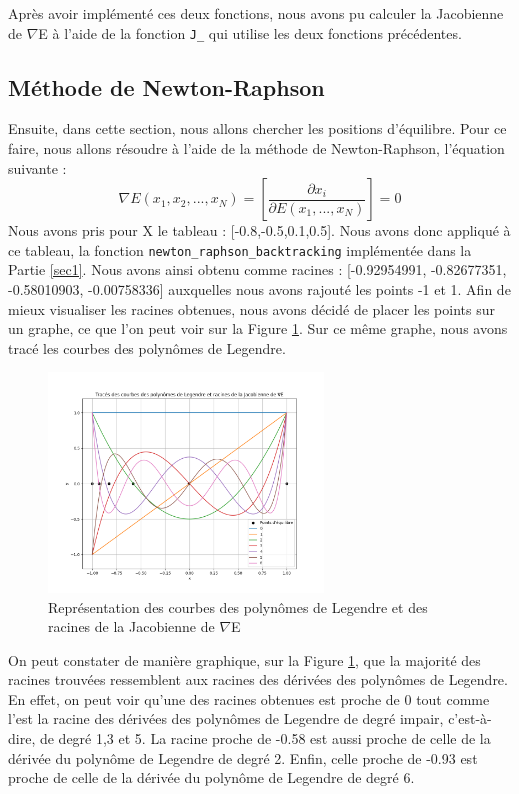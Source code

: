 Après avoir implémenté ces deux fonctions, nous avons pu calculer la Jacobienne de $\nabla$E à l'aide de la fonction \verb|J_| qui utilise les deux fonctions précédentes. 
\subsection{Méthode de Newton-Raphson}
Ensuite, dans cette section, nous allons chercher les positions d'équilibre. Pour ce faire, nous allons résoudre à l'aide de la méthode de Newton-Raphson, l'équation suivante :
\begin{equation*}
    \nabla E(x_{1}, x_{2}, ..., x_{N}) = \left[\frac{\partial x_{i}}{\partial E(x_{1},...,x_{N})}\right]=0
\end{equation*}
Nous avons pris pour X le tableau : [-0.8,-0.5,0.1,0.5]. Nous avons donc appliqué à ce tableau, la fonction \verb|newton_raphson_backtracking| implémentée dans la Partie \ref{sec1}.
Nous avons ainsi obtenu comme racines : [-0.92954991, -0.82677351, -0.58010903, -0.00758336] auxquelles nous avons rajouté les points -1 et 1. Afin de mieux visualiser les racines obtenues, nous 
avons décidé de placer les points sur un graphe, ce que l'on peut voir sur la Figure \ref{fig:p2-c-legendre}. Sur ce même graphe, nous avons tracé les courbes des 
polynômes de Legendre. 
\begin{figure}[htbp!]
    \centering
    \includegraphics[width=0.65\textwidth]{res/part2_legendre.png}
    \caption{Représentation des courbes des polynômes de Legendre et des racines de la Jacobienne de $\nabla$E}
    \label{fig:p2-c-legendre}
\end{figure} 
On peut constater de manière graphique, sur la Figure \ref{fig:p2-c-legendre}, que la majorité des racines trouvées ressemblent
aux racines des dérivées des polynômes de Legendre. En effet, on peut voir qu'une des racines obtenues est proche de 0
tout comme l'est la racine des dérivées des polynômes de Legendre de degré impair, c'est-à-dire, de degré 1,3 et 5.
La racine proche de -0.58 est aussi proche de celle de la dérivée du polynôme de Legendre de degré 2.
Enfin, celle proche de -0.93 est proche de celle de la dérivée du polynôme de Legendre de degré 6.
